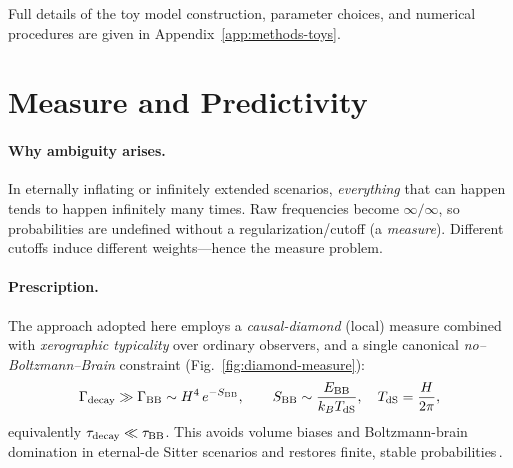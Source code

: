 \documentclass[12pt]{article}
\theoremstyle{remark}
\begin{document}
Full details of the toy model construction, parameter choices, and numerical procedures are given in Appendix~\ref{app:methods-toys}.



\section{Measure and Predictivity}\label{sec:measure}
\paragraph{Why ambiguity arises.} In eternally inflating or infinitely extended scenarios, \emph{everything} that can happen tends to happen infinitely many times. Raw frequencies become $\infty/\infty$, so probabilities are undefined without a regularization/cutoff (a \emph{measure}). Different cutoffs induce different weights---hence the measure problem.

\paragraph{Prescription.} The approach adopted here employs a \emph{causal-diamond} (local) measure combined with \emph{xerographic typicality} over ordinary observers, and a single canonical \emph{no--Boltzmann--Brain} constraint (Fig.~\ref{fig:diamond-measure}):
\begin{equation}
 \Gamma_{\rm decay} \gg \Gamma_{\rm BB} \sim H^4\,e^{-S_{\rm BB}},\qquad 
 S_{\rm BB}\sim \frac{E_{\rm BB}}{k_B T_{\rm dS}},\quad T_{\rm dS}=\frac{H}{2\pi},
\end{equation}
equivalently $\tau_{\rm decay}\ll \tau_{\rm BB}$. This avoids volume biases and Boltzmann-brain domination in eternal-de Sitter scenarios and restores finite, stable probabilities\,\cite{DysonKlebanSusskind2002,Page2007}.
\end{document}
